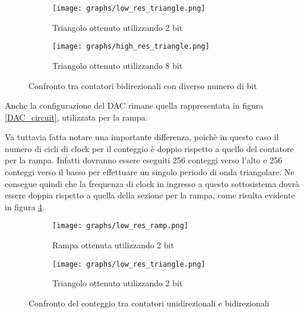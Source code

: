 \begin{figure}[ht]
    \centering

    \begin{subfigure}{.5\textwidth}
        \centering
        \texttt{[image: graphs/low\_res\_triangle.png]}
        \caption{Triangolo ottenuto utilizzando 2 bit}
        \label{low_res_triangle}
    \end{subfigure}%
    \begin{subfigure}{.5\textwidth}
        \centering
        \texttt{[image: graphs/high\_res\_triangle.png]}
        \caption{Triangolo ottenuto utilizzando 8 bit}
        \label{high_res_triangle}
    \end{subfigure}

    \caption{Confronto tra contatori bidirezionali con diverso numero di bit}
    \label{triangles}
\end{figure}

Anche la configurazione del DAC rimane quella rappresentata in figura \ref{DAC_circuit},
utilizzata per la rampa.

Va tuttavia fatta notare una importante differenza, poichè in questo caso il numero di cicli
di clock per il conteggio è doppio rispetto a quello del contatore per la rampa. Infatti
dovranno essere eseguiti 256 conteggi verso l'alto e 256 conteggi verso il basso per effettuare
un singolo periodo di onda triangolare. Ne consegue quindi che la frequenza di clock in ingresso
a questo sottosistema dovrà essere doppia rispetto a quella della sezione per la rampa, come
risulta evidente in figura \ref{steps}.
\medskip

\begin{figure}[ht]
    \centering

    \begin{subfigure}{.5\textwidth}
        \centering
        \texttt{[image: graphs/low\_res\_ramp.png]}
        \caption{Rampa ottenuta utilizzando 2 bit}
    \end{subfigure}%
    \begin{subfigure}{.5\textwidth}
        \centering
        \texttt{[image: graphs/low\_res\_triangle.png]}
        \caption{Triangolo ottenuto utilizzando 2 bit}
    \end{subfigure}

    \caption{Confronto del conteggio tra contatori unidirezionali e bidirezionali}
    \label{steps}
\end{figure}


